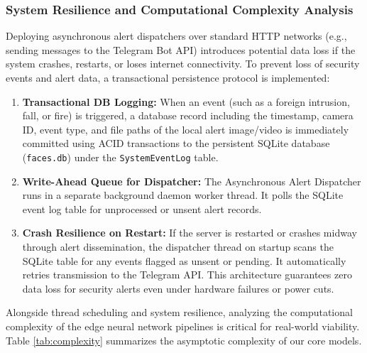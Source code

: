 \documentclass[12pt,a4paper]{article}
\begin{document}
\subsubsection*{System Resilience and Computational Complexity Analysis}
Deploying asynchronous alert dispatchers over standard HTTP networks (e.g., sending messages to the Telegram Bot API) introduces potential data loss if the system crashes, restarts, or loses internet connectivity. To prevent loss of security events and alert data, a transactional persistence protocol is implemented:
\begin{enumerate}
    \item \textbf{Transactional DB Logging:} When an event (such as a foreign intrusion, fall, or fire) is triggered, a database record including the timestamp, camera ID, event type, and file paths of the local alert image/video is immediately committed using ACID transactions to the persistent SQLite database (\texttt{faces.db}) under the \texttt{SystemEventLog} table.
    \item \textbf{Write-Ahead Queue for Dispatcher:} The Asynchronous Alert Dispatcher runs in a separate background daemon worker thread. It polls the SQLite event log table for unprocessed or unsent alert records.
    \item \textbf{Crash Resilience on Restart:} If the server is restarted or crashes midway through alert dissemination, the dispatcher thread on startup scans the SQLite table for any events flagged as unsent or pending. It automatically retries transmission to the Telegram API. This architecture guarantees zero data loss for security alerts even under hardware failures or power cuts.
\end{enumerate}

Alongside thread scheduling and system resilience, analyzing the computational complexity of the edge neural network pipelines is critical for real-world viability. Table \ref{tab:complexity} summarizes the asymptotic complexity of our core models.

\begin{table}[h]
    \centering
    \caption{Computational Complexity of Proposed System Modules}
    \label{tab:complexity}
\end{table}
\end{document}
